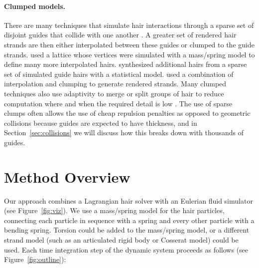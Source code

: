 \paragraph{Clumped models.}  There are many techniques that simulate hair
interactions through a sparse set of disjoint guides that collide with one
another
\cite{bertails:2006:superhelices,hadap:2006:orientedstrands,gupta:2006:real-time-hair,chang:2002:mutualinteractions}.
A greater set of rendered hair strands are then either interpolated between
these guides or clumped to the guide strands.
\cite{plante:2002:hair-complexity} used a lattice whose vertices were simulated
with a mass/spring model to define many more interpolated
hairs. \cite{choe:2005:simulating-complex-hair} synthesized additional hairs
from a sparse set of simulated guide hairs with a statistical
model. \cite{bertails:2006:superhelices} used a combination of interpolation and
clumping to generate rendered strands.  Many clumped techniques also use
adaptivity to merge or split groups of hair to reduce computation where and when
the required detail is low
\cite{bertails:2003:adaptive-wisp-tree,ward:2003:modeling-hair-lod,ward:2003:adaptive-grouping-hair}. The
use of sparse clumps often allows the use of cheap repulsion penalties as
opposed to geometric collisions because guides are expected to have
thickness, and in Section~\ref{sec:collisions} we will discuss how this breaks
down with thousands of guides.



\section{Method Overview}

Our approach combines a Lagrangian hair solver with an Eulerian fluid simulator
(see Figure~\ref{fig:viz}).
We use a mass/spring model for the hair particles, connecting each particle in
sequence with a spring and every other particle with a bending spring.  Torsion
could be added to the mass/spring model, or a different strand model (such as an
articulated rigid body or Cosserat model) could be used. Each time integration step of the
dynamic system proceeds as follows (see Figure~\ref{fig:outline}):


